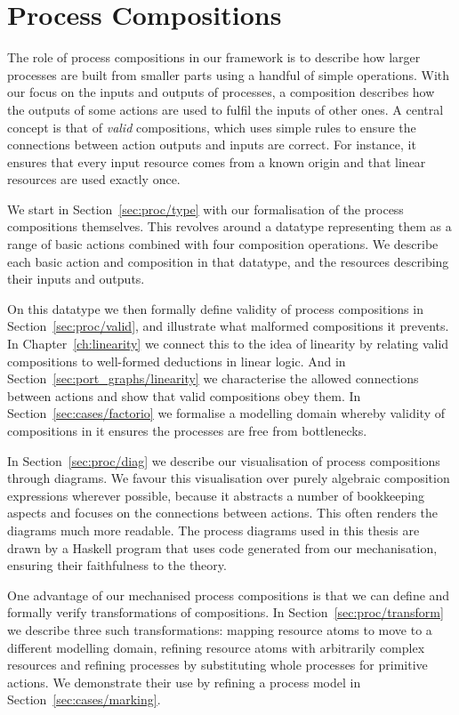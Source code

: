 \documentclass[class=smolathesis,crop=false]{standalone}
\begin{document}
\chapter{Process Compositions}
\label{ch:proc}

The role of process compositions in our framework is to describe how larger processes are built from smaller parts using a handful of simple operations.
With our focus on the inputs and outputs of processes, a composition describes how the outputs of some actions are used to fulfil the inputs of other ones.
A central concept is that of \emph{valid} compositions, which uses simple rules to ensure the connections between action outputs and inputs are correct.
For instance, it ensures that every input resource comes from a known origin and that linear resources are used exactly once.

We start in Section~\ref{sec:proc/type} with our formalisation of the process compositions themselves.
This revolves around a datatype representing them as a range of basic actions combined with four composition operations.
We describe each basic action and composition in that datatype, and the resources describing their inputs and outputs.

On this datatype we then formally define validity of process compositions in Section~\ref{sec:proc/valid}, and illustrate what malformed compositions it prevents.
In Chapter~\ref{ch:linearity} we connect this to the idea of linearity by relating valid compositions to well-formed deductions in linear logic.
And in Section~\ref{sec:port_graphs/linearity} we characterise the allowed connections between actions and show that valid compositions obey them.
In Section~\ref{sec:cases/factorio} we formalise a modelling domain whereby validity of compositions in it ensures the processes are free from bottlenecks.

In Section~\ref{sec:proc/diag} we describe our visualisation of process compositions through diagrams.
We favour this visualisation over purely algebraic composition expressions wherever possible, because it abstracts a number of bookkeeping aspects and focuses on the connections between actions.
This often renders the diagrams much more readable.
The process diagrams used in this thesis are drawn by a Haskell program that uses code generated from our mechanisation, ensuring their faithfulness to the theory.

One advantage of our mechanised process compositions is that we can define and formally verify transformations of compositions.
In Section~\ref{sec:proc/transform} we describe three such transformations: mapping resource atoms to move to a different modelling domain, refining resource atoms with arbitrarily complex resources and refining processes by substituting whole processes for primitive actions.
We demonstrate their use by refining a process model in Section~\ref{sec:cases/marking}.
\end{document}
